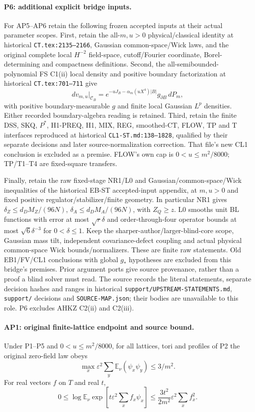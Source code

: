 \documentclass[11pt]{article}
\theoremstyle{plain}
\theoremstyle{definition}
\theoremstyle{remark}
\newcommand{\E}{\mathbb{E}}
\begin{document}
\paragraph{P6: additional explicit bridge inputs.}
For AP5--AP6 retain the following frozen accepted inputs at their actual
parameter scopes. First, retain the all-$m,u>0$ physical/classical identity
at historical \texttt{CT.tex:2135--2166}, Gaussian common-space/Wick laws,
and the original complete local $H^{-2}$ field-space, cutoff/Fourier
coordinate, Borel-determining and compactness definitions.
Second, the all-semibounded-polynomial FS C1(ii) local density and positive
boundary factorization at historical \texttt{CT.tex:701--711} give
\[
 dv_{m,u}|_{\mathcal C_B}
 =e^{-uJ_B-\alpha_m(uX^4)|B|}g_{\partial B}\,dP_m,
\]
with positive boundary-measurable $g$ and finite local Gaussian $L^p$
densities. Either recorded boundary-algebra reading is retained.
Third, retain the finite DSS, SKQ, $P^*$, H1-PREQ, H1, MIX, REG, smoothed-CT, FLOW,
TP and T interfaces reproduced at historical \texttt{CL1-ST.md:138--1828},
qualified by their separate decisions and later source-normalization
correction. That file's new CL1 conclusion is excluded as a premise.
FLOW's own cap is $0<u\le m^2/8000$; TP/T1--T4 are fixed-square transfers.

Finally, retain the raw fixed-stage NR1/L0 and Gaussian/common-space/Wick
inequalities of the historical EB-ST accepted-input appendix, at $m,u>0$
and fixed positive regulator/stabilizer/finite geometry. In particular
NR1 gives $\delta_Z\le d_D M_Z/(96N)$,
$\delta_A\le d_D M_A/(96N)$, with $Z_Q\ge z$.
L0 smooths unit BL functions with error at most $\sqrt r\delta$ and
order-through-four operator bounds at most $\sqrt6\delta^{-3}$ for
$0<\delta\le1$. Keep the sharper-author/larger-blind-core scope, Gaussian
mass tilt, independent covariance-defect coupling and actual physical
common-space Wick bounds/normalizers. These are finite raw statements.
Old EB1/FV/CL1 conclusions with global $g_*$ hypotheses are excluded from
this bridge's premises. Prior argument ports give source provenance,
rather than a proof a blind solver must read. The source records the
literal statements, separate decision hashes and ranges in historical
\texttt{support/UPSTREAM-STATEMENTS.md}, \texttt{support/} decisions and
\texttt{SOURCE-MAP.json}; their bodies are unavailable to this role.
P6 excludes AHKZ C2(ii) and C2(iii).

\paragraph{AP1: original finite-lattice endpoint and source bound.}
Under P1--P5 and $0<u\le m^2/8000$, for all lattices, tori and profiles
of P2 the original zero-field law obeys
\[
 \max_x\varepsilon^2\sum_y\E_\nu(\psi_x\psi_y)\le3/m^2.
\]
For real vectors $f$ on $T$ and real $t$,
\[
 0\le\log\E_\nu\exp\left[t\varepsilon^2\sum_xf_x\psi_x\right]
       \le\frac{3t^2}{2m^2}\varepsilon^2\sum_xf_x^2.
\]
\end{document}
